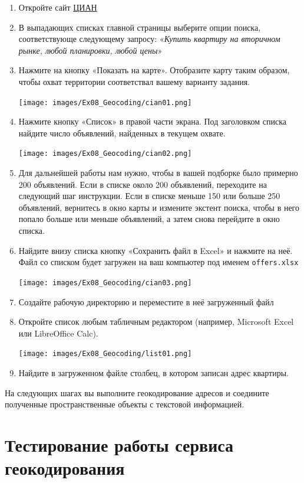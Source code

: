 \documentclass[
  12pt,
]{book}
\begin{document}
\begin{enumerate}
\def\labelenumi{\arabic{enumi}.}
\item
  Откройте сайт \href{https://www.cian.ru/}{ЦИАН}
\item
  В выпадающих списках главной страницы выберите опции поиска, соответствующе следующему запросу: «\emph{Купить квартиру на вторичном рынке, любой планировки, любой цены}»
\item
  Нажмите на кнопку «Показать на карте». Отобразите карту таким образом, чтобы охват территории соответствал вашему варианту задания.

  \texttt{[image: images/Ex08\_Geocoding/cian01.png]}
\item
  Нажмите кнопку «Список» в правой части экрана. Под заголовком списка найдите число объявлений, найденных в текущем охвате.

  \texttt{[image: images/Ex08\_Geocoding/cian02.png]}
\item
  Для дальнейшей работы нам нужно, чтобы в вашей подборке было примерно 200 объявлений. Если в списке около 200 объявлений, переходите на следующий шаг инструкции. Если в списке меньше 150 или больше 250 объявлений, вернитесь в окно карты и измените экстент поиска, чтобы в него попало больше или меньше объявлений, а затем снова перейдите в окно списка.
\item
  Найдите внизу списка кнопку «Сохранить файл в Excel» и нажмите на неё. Файл со списком будет загружен на ваш компьютер под именем \texttt{offers.xlsx}

  \texttt{[image: images/Ex08\_Geocoding/cian03.png]}
\item
  Создайте рабочую директорию и переместите в неё загруженный файл
\item
  Откройте список любым табличным редактором (например, Microsoft Excel или LibreOffice Calc).

  \texttt{[image: images/Ex08\_Geocoding/list01.png]}
\item
  Найдите в загруженном файле столбец, в котором записан адрес квартиры.
\end{enumerate}

На следующих шагах вы выполните геокодирование адресов и соедините полученные пространственные объекты с текстовой информацией.

\hypertarget{geocoding-debug}{%
\section{Тестирование работы сервиса геокодирования}\label{geocoding-debug}}
\end{document}
